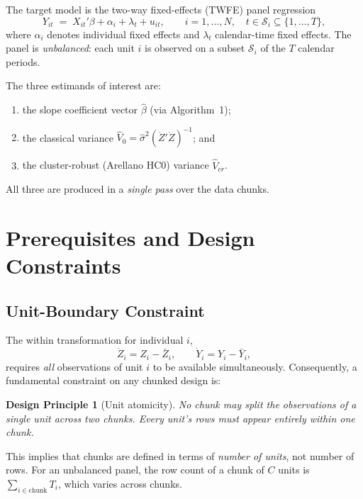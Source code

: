 \documentclass[11pt, a4paper]{article}
\newtheorem{principle}{Design Principle}
\begin{document}
The target model is the two-way fixed-effects (TWFE) panel regression
\[
  Y_{it} \;=\; X_{it}'\beta + \alpha_i + \lambda_t + u_{it},
  \qquad i = 1,\ldots,N,\quad t \in \mathcal{S}_i \subseteq \{1,\ldots,T\},
\]
where $\alpha_i$ denotes individual fixed effects and $\lambda_t$ calendar-time
fixed effects.  The panel is \emph{unbalanced}: each unit $i$ is observed on a
subset $\mathcal{S}_i$ of the $T$ calendar periods.

The three estimands of interest are:
\begin{enumerate}
  \item[(i)] the slope coefficient vector $\hat\beta$ (via Algorithm~1);
  \item[(ii)] the classical variance $\widehat{V}_0 = \hat\sigma^2
        (\dot{Z}'\dot{Z})^{-1}$; and
  \item[(iii)] the cluster-robust (Arellano HC0) variance $\hat{V}_{cr}$.
\end{enumerate}
All three are produced in a \emph{single pass} over the data chunks.

\section{Prerequisites and Design Constraints}

\subsection{Unit-Boundary Constraint}

The within transformation for individual $i$,
\[
  \dot{Z}_i = Z_i - \bar{Z}_i, \qquad \dot{Y}_i = Y_i - \bar{Y}_i,
\]
requires \emph{all} observations of unit $i$ to be available simultaneously.
Consequently, a fundamental constraint on any chunked design is:

\begin{principle}[Unit atomicity]
No chunk may split the observations of a single unit across two chunks.
Every unit's rows must appear entirely within one chunk.
\end{principle}

This implies that chunks are defined in terms of \emph{number of units}, not
number of rows.  For an unbalanced panel, the row count of a chunk of $C$ units
is $\sum_{i \in \mathrm{chunk}} T_i$, which varies across chunks.
\end{document}
